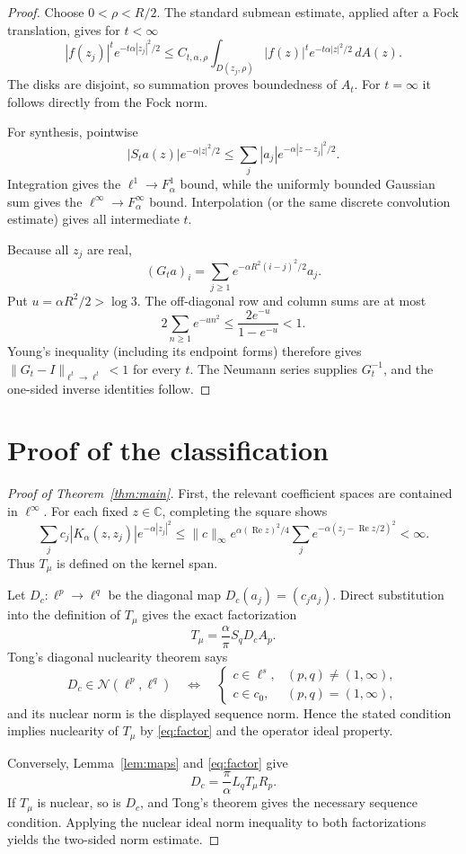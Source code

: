 \documentclass[10pt]{article}
\newcommand{\Nuc}{\mathcal N}
\newcommand{\C}{\mathbb C}
\begin{document}
\begin{proof}
Choose $0<\rho<R/2$.  The standard submean estimate, applied after a Fock
translation, gives for $t<\infty$
\[
 |f(z_j)|^t e^{-t\alpha|z_j|^2/2}
 \le C_{t,\alpha,\rho}
 \int_{D(z_j,\rho)}|f(z)|^t e^{-t\alpha|z|^2/2}\,dA(z).
\]
The disks are disjoint, so summation proves boundedness of $A_t$.  For
$t=\infty$ it follows directly from the Fock norm.

For synthesis, pointwise
\[
 |S_ta(z)|e^{-\alpha|z|^2/2}
 \le\sum_j|a_j|e^{-\alpha|z-z_j|^2/2}.
\]
Integration gives the $\ell^1\to F_\alpha^1$ bound, while the uniformly bounded
Gaussian sum gives the $\ell^\infty\to F_\alpha^\infty$ bound.  Interpolation
(or the same discrete convolution estimate) gives all intermediate $t$.

Because all $z_j$ are real,
\[
 (G_ta)_i=\sum_{j\ge1}e^{-\alpha R^2(i-j)^2/2}a_j.
\]
Put $u=\alpha R^2/2>\log3$.  The off-diagonal row and column sums are at most
\[
 2\sum_{n\ge1}e^{-un^2}
 \le \frac{2e^{-u}}{1-e^{-u}}<1.
\]
Young's inequality (including its endpoint forms) therefore gives
$\|G_t-I\|_{\ell^t\to\ell^t}<1$ for every $t$.  The Neumann series supplies
$G_t^{-1}$, and the one-sided inverse identities follow.
\end{proof}

\section*{Proof of the classification}

\begin{proof}[Proof of Theorem~\ref{thm:main}]
First, the relevant coefficient spaces are contained in $\ell^\infty$.  For
each fixed $z\in\C$, completing the square shows
\[
 \sum_j c_j|K_\alpha(z,z_j)|e^{-\alpha|z_j|^2}
 \le \|c\|_\infty e^{\alpha(\operatorname{Re}z)^2/4}
       \sum_j e^{-\alpha(z_j-\operatorname{Re}z/2)^2}<\infty.
\]
Thus $T_\mu$ is defined on the kernel span.

Let $D_c:\ell^p\to\ell^q$ be the diagonal map
$D_c(a_j)=(c_ja_j)$.  Direct substitution into the definition of $T_\mu$
gives the exact factorization
\begin{equation}\label{eq:factor}
                 T_\mu=\frac{\alpha}{\pi}S_qD_cA_p.
\end{equation}
Tong's diagonal nuclearity theorem \cite{Tong,HLS} says
\[
 D_c\in\Nuc(\ell^p,\ell^q)
 \quad\Longleftrightarrow\quad
 \begin{cases}
 c\in\ell^s,&(p,q)\ne(1,\infty),\\
 c\in c_0,&(p,q)=(1,\infty),
 \end{cases}
\]
and its nuclear norm is the displayed sequence norm.  Hence the stated
condition implies nuclearity of $T_\mu$ by \eqref{eq:factor} and the operator
ideal property.

Conversely, Lemma~\ref{lem:maps} and \eqref{eq:factor} give
\[
                 D_c=\frac{\pi}{\alpha}L_qT_\mu R_p.
\]
If $T_\mu$ is nuclear, so is $D_c$, and Tong's theorem gives the necessary
sequence condition.  Applying the nuclear ideal norm inequality to both
factorizations yields the two-sided norm estimate.
\end{proof}
\end{document}
